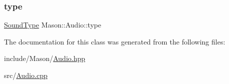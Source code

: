 \subsubsection{\texorpdfstring{type}{type}}
{\footnotesize\ttfamily \hyperlink{namespace_mason_a158d651086d1ba1aacc4c37125b27657}{Sound\+Type} Mason\+::\+Audio\+::type}



The documentation for this class was generated from the following files\+:\begin{DoxyCompactItemize}
\item 
include/\+Mason/\hyperlink{_audio_8hpp}{Audio.\+hpp}\item 
src/\hyperlink{_audio_8cpp}{Audio.\+cpp}\end{DoxyCompactItemize}
